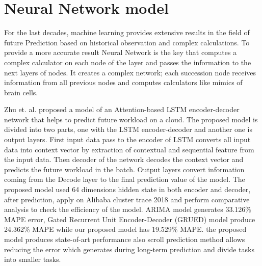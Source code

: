\section{ Neural Network model}
 
For the last decades, machine learning provides extensive results in the field of future Prediction based on historical observation and complex calculations. To provide a more accurate result Neural Network is the key that computes a complex calculator on each node of the layer and passes the information to the next layers of nodes. It creates a complex network; each succession node receives information from all previous nodes and computes calculators like mimics of brain cells.

Zhu et. al. \cite{zhu2019novel} proposed a model of an Attention-based LSTM encoder-decoder network that helps to predict future workload on a cloud. The proposed model is divided into two parts, one with the LSTM encoder-decoder and another one is output layers. First input data pass to the encoder of LSTM converts all input data into context vector by extraction of contextual and sequential feature from the input data. Then decoder of the network decodes the context vector and predicts the future workload in the batch. Output layers convert information coming from the Decode layer to the final prediction value of the model. The proposed model used 64 dimensions hidden state in both encoder and decoder, after prediction, apply on Alibaba cluster trace 2018 and perform comparative analysis to check the efficiency of the model. ARIMA model generates 33.126\% MAPE error, Gated Recurrent Unit Encoder-Decoder (GRUED) model produce 24.362\% MAPE while our proposed model has 19.529\% MAPE. the proposed model produces state-of-art performance also scroll prediction method allows reducing the error which generates during long-term prediction and divide tasks into smaller tasks.

